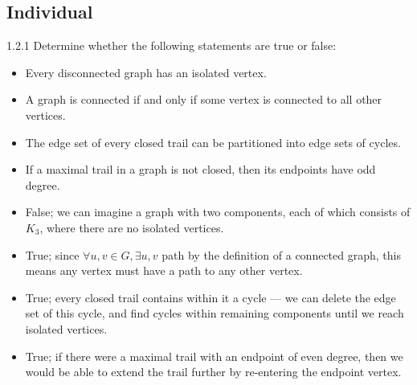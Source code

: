 \documentclass[9pt]{extarticle}
\begin{document}
\subsection*{Individual}%
\begin{problem}{1.2.1}
    Determine whether the following statements are true or false:
      \begin{itemize}
        \item Every disconnected graph has an isolated vertex.
        \item A graph is connected if and only if some vertex is connected to all other vertices.
        \item The edge set of every closed trail can be partitioned into edge sets of cycles.
        \item If a maximal trail in a graph is not closed, then its endpoints have odd degree.
      \end{itemize}
      \tcblower
      \begin{itemize}
        \item False; we can imagine a graph with two components, each of which consists of $K_3$, where there are no isolated vertices.
        \item True; since $\forall u,v\in G,\exists u,v$ path by the definition of a connected graph, this means any vertex must have a path to any other vertex.
        \item True; every closed trail contains within it a cycle --- we can delete the edge set of this cycle, and find cycles within remaining components until we reach isolated vertices.
        \item True; if there were a maximal trail with an endpoint of even degree, then we would be able to extend the trail further by re-entering the endpoint vertex.
      \end{itemize}
\end{problem}
\end{document}
